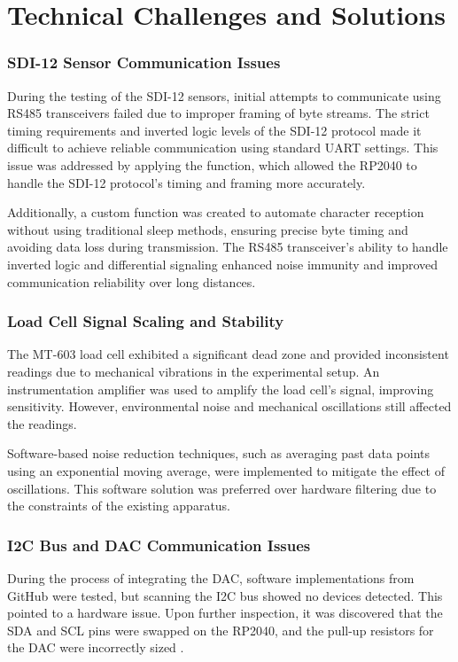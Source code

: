 \section{Technical Challenges and Solutions}

\subsubsection{SDI-12 Sensor Communication Issues}
During the testing of the SDI-12 sensors, initial attempts to communicate using RS485 transceivers failed due to improper framing of byte streams. The strict timing requirements and inverted logic levels of the SDI-12 protocol made it difficult to achieve reliable communication using standard UART settings. This issue was addressed by applying the  function, which allowed the RP2040 to handle the SDI-12 protocol's timing and framing more accurately.

Additionally, a custom  function was created to automate character reception without using traditional sleep methods, ensuring precise byte timing and avoiding data loss during transmission. The RS485 transceiver's ability to handle inverted logic and differential signaling enhanced noise immunity and improved communication reliability over long distances.

\subsubsection{Load Cell Signal Scaling and Stability}
The MT-603 load cell exhibited a significant dead zone and provided inconsistent readings due to mechanical vibrations in the experimental setup. An instrumentation amplifier was used to amplify the load cell's signal, improving sensitivity. However, environmental noise and mechanical oscillations still affected the readings.

Software-based noise reduction techniques, such as averaging past data points using an exponential moving average, were implemented to mitigate the effect of oscillations. This software solution was preferred over hardware filtering due to the constraints of the existing apparatus.

\subsubsection{I2C Bus and DAC Communication Issues}
During the process of integrating the DAC, software implementations from GitHub were tested, but scanning the I2C bus showed no devices detected. This pointed to a hardware issue. Upon further inspection, it was discovered that the SDA and SCL pins were swapped on the RP2040, and the pull-up resistors for the DAC were incorrectly sized \cite{DAC_datasheet}.

